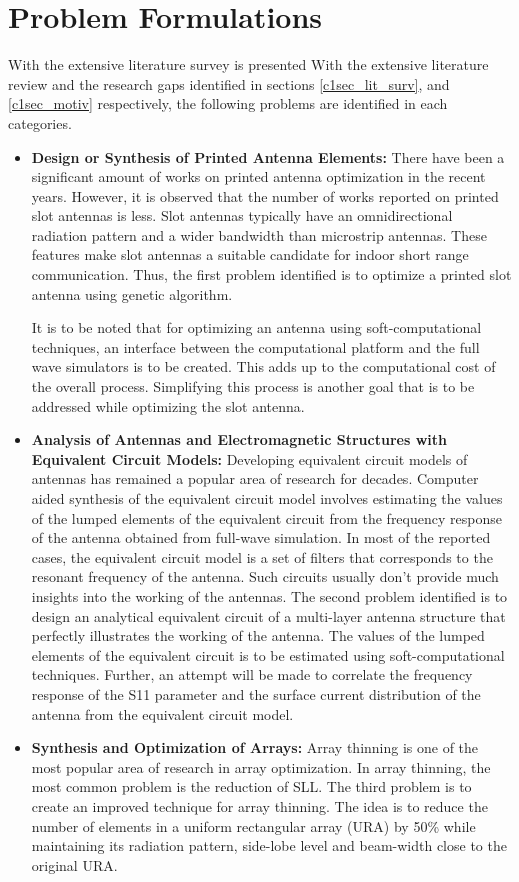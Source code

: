\section{Problem Formulations} \label{c1sec_prob}
With the extensive literature survey is presented With the extensive literature review and the research gaps identified in sections \ref{c1sec_lit_surv}, and \ref{c1sec_motiv} respectively, the following problems are identified in each categories.

\begin{itemize}
\item \textbf{Design or Synthesis of Printed Antenna Elements:} There have been a significant amount of works on printed antenna optimization in the recent years. However, it is observed that the number of works reported on printed slot antennas is less. Slot antennas typically have an omnidirectional radiation pattern and a wider bandwidth than microstrip antennas. These features make slot antennas a suitable candidate for indoor short range communication. Thus, the first problem identified is to optimize a printed slot antenna using genetic algorithm.

    It is to be noted that for optimizing an antenna using soft-computational techniques, an interface between the computational platform and the full wave simulators is to be created. This adds up to the computational cost of the overall process. Simplifying this process is another goal that is to be addressed while optimizing the slot antenna.
\item \textbf{Analysis of Antennas and Electromagnetic Structures with Equivalent Circuit Models:} Developing equivalent circuit models of antennas has remained a popular area of research for decades. Computer aided synthesis of the equivalent circuit model involves estimating the values of the lumped elements of the equivalent circuit from the frequency response of the antenna obtained from full-wave simulation. In most of the reported cases, the equivalent circuit model is a set of filters that corresponds to the resonant frequency of the antenna. Such circuits usually don't provide much insights into the working of the antennas. The second problem identified is to design an analytical equivalent circuit of a multi-layer antenna structure that perfectly illustrates the working of the antenna. The values of the lumped elements of the equivalent circuit is to be estimated using soft-computational techniques. Further, an attempt will be made to correlate the frequency response of the S11 parameter and the surface current distribution of the antenna from the equivalent circuit model.
\item \textbf{Synthesis and Optimization of Arrays:} Array thinning is one of the most popular area of research in array optimization. In array thinning, the most common problem is the reduction of SLL. The third problem is to create an improved technique for array thinning. The idea is to reduce the number of elements in a uniform rectangular array (URA) by 50\% while maintaining its radiation pattern, side-lobe level and beam-width close to the original URA.


\end{itemize}
